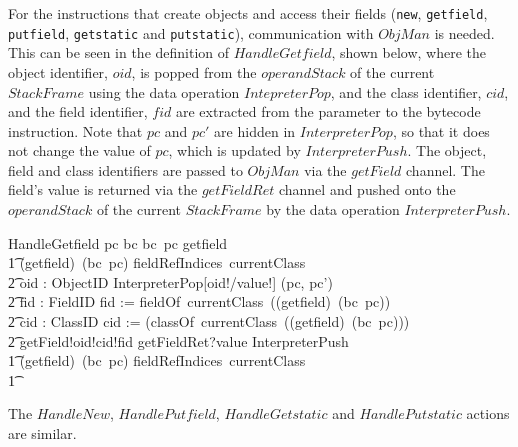 For the instructions that create objects and access their fields
(\texttt{new}, \texttt{getfield}, \texttt{putfield},
\texttt{getstatic} and \texttt{putstatic}), communication with
$ObjMan$ is needed.
This can be seen in the definition of $HandleGetfield$, shown below,
where the object identifier, $oid$, is popped from the $operandStack$
of the current $StackFrame$ using the data operation $IntepreterPop$,
and the class identifier, $cid$, and the field identifier, $fid$ are
extracted from the parameter to the bytecode instruction.
Note that $pc$ and $pc'$ are hidden in $InterpreterPop$, so that it
does not change the value of $pc$, which is updated by
$InterpreterPush$. 
The object, field and class identifiers are passed to $ObjMan$ via the
$getField$ channel.
The field's value is returned via the $getFieldRet$ channel and pushed
onto the $operandStack$ of the current $StackFrame$ by the data
operation $InterpreterPush$.
\begin{circusaction}
  HandleGetfield \circdef \lcircguard pc \in \dom bc \land bc~pc \in \ran getfield \rcircguard \circguard \\
  \t1 \circif (getfield\inv)~(bc~pc) \in fieldRefIndices~currentClass \circthen {} \\
  \t2 \circvar oid : ObjectID \circspot \lschexpract InterpreterPop[oid!/value!] \hide (pc, pc') \rschexpract \circseq \\
  \t2 \circvar fid : FieldID \circspot fid := fieldOf~currentClass~((getfield\inv)~(bc~pc)) \circseq \\
  \t2 \circvar cid : ClassID \circspot cid := (classOf~currentClass~((getfield\inv)~(bc~pc))) \circseq \\
  \t2 getField!oid!cid!fid \then getFieldRet?value \then \lschexpract InterpreterPush \rschexpract \\
  \t1 {} \circelse (getfield\inv)~(bc~pc) \notin fieldRefIndices~currentClass \circthen \Chaos \\
  \t1 \circfi
\end{circusaction}
The $HandleNew$, $HandlePutfield$, $HandleGetstatic$ and
$HandlePutstatic$ actions are similar.

